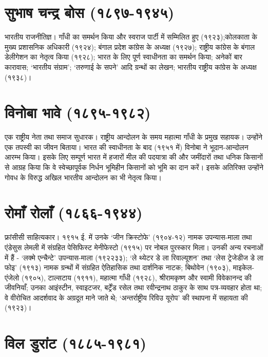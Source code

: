 \section*{सुभाष चन्द्र बोस (१८९७-१९४५) }

भारतीय राजनीतिज्ञ। गाँधी का समर्थन किया और स्वराज पार्टी में सम्मिलित हुए (१९२३);\break कोलकाता के मुख्य प्रशासनिक अधिकारी (१९२४); बंगाल प्रदेश कांग्रेस के अध्यक्ष (१९२७); राष्ट्रीय कांग्रेस के बंगाल डेलीगेशन का नेतृत्व किया (१९२८); भारत के लिए पूर्ण स्वाधीनता का समर्थन किया; अनेकों बार कारावास; ‘भारतीय संग्राम’; ‘तरुणाई के सपने’ आदि ग्रन्थों का लेखन; भारतीय राष्ट्रीय कांग्रेस के अध्यक्ष (१९३८)। 

\section*{विनोबा भावे (१८९५-१९८२) }

एक राष्ट्रीय नेता तथा समाज सुधारक। राष्ट्रीय आन्दोलन के समय महात्मा गाँधी के प्रमुख सहायक। उन्होंने एक तपस्वी का जीवन बिताया। भारत की स्वाधीनता के बाद (१९५१ में) विनोबा ने भूदान-आन्दोलन आरम्भ किया। इसके लिए सम्पूर्ण भारत में हजारों मील की पदयात्रा की और जमींदारों तथा धनिक किसानों से आग्रह किया कि वे स्वेच्छापूर्वक निर्धन भूमिहीन किसानों को भूमि का दान करें। इसके अतिरिक्त उन्होंने गोवध के विरुद्ध अखिल भारतीय आन्दोलन का भी नेतृत्व किया। 

\section*{रोमाँ रोलाँ (१८६६-१९४४) }

फ्रांसीसी साहित्यकार। १९१५ ई. में उनके ‘जीन क्रिस्टोफे’ (१९०४-१२) नामक उपन्यास-माला तथा एंडेसुस लेमली में संग्रहित पेसिफिस्ट मेनीफेस्टो (१९१५) पर नोबल पुरस्कार मिला। उनकी अन्य रचनाओं में हैं - ‘लक्मे एन्चैन्टे’ उपन्यास-माला (१९२२३३); ‘ले थ्येटर डे ला रिवाल्यूशन’ तथा ‘लेस ट्रेजेडीज डे ला फोइ’ (१९१३) नामक ग्रन्थों में संग्रहित ऐतिहासिक तथा दार्शनिक नाटक; बिथोवेन (१९०३), माइकेल-एंजेलो (१९०५), टाल्सटाय (१९११), महात्मा गाँधी (१९२८), श्रीरामकृष्ण और स्वामी विवेकानन्द की जीवनियाँ; उनका आइंस्टीन, स्वाइटजर, बर्ट्रेंड रसेल तथा रवीन्द्रनाथ ठाकुर के साथ पत्र-व्यवहार होता था; वे वीरोचित आदर्शवाद के अग्रदूत माने जाते थे; ‘अन्तर्राष्ट्रीय रिविउ यूरोप’ की स्थापना में सहायता की (१९२३)। 

\section*{विल डुरांट (१८८५-१९८१) }

